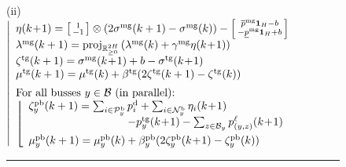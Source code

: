 \documentclass{IEEEtran}  %
\newcommand{\mc}{\mathcal}
\newcommand{\bb}{\mathbb}
\newcommand{\R}{\bb R}
\newcommand{\proj}{\mathrm{proj}}
\newcommand{\0}{\mathbf{0}}
\newcommand{\1}{\mathbf{1}}
\begin{document}
\begin{figure}[t]
{\begin{minipage}{\columnwidth}
\medskip
\noindent
\noindent 
(ii) \\[.2em]
\hspace*{.15em}
$
\left| 
\begin{array}{l}
%
\eta(k\!+\!1) = 
	\left[
	\begin{smallmatrix}
	1\\
	- 1 
	\end{smallmatrix}
	\right] \otimes (2 \sigma^{\text{mg}}(k+1)- \sigma^{\text{mg}}(k)) 
	-
	\left[
	\begin{smallmatrix}
	\overline{p}^{\mathrm{mg}}\1_{H}-b \\
	-     \underline{p}^{\mathrm{mg}} \1_{H}+b
	\end{smallmatrix} 
	\right]\\
	\lambda^{\text{mg}}(k+1) = \textstyle
	\proj_{\R^{2 H}_{\geq 0}}\left( 
	\lambda^{\text{mg}}(k) + \gamma^{\text{mg}} \eta(k\!+\!1)
	 \right)\\
%
\zeta^{\text{tg}}(k+1) = \sigma^{\text{mg}}
	(k\!+\!1)+b- \sigma^{\text{tg}}(k\!+\!1)\\
	\mu^{\text{tg}}(k+1) = \mu^{\text{tg}}(k) + \beta^{\text{tg}} (2\zeta^{\text{tg}}(k+1)-\zeta^{\text{tg}}(k))\\[.5em]
\text{For all busses } y \in \mc B \text{ (in parallel):}\\
\left\lfloor
\begin{array}{l}
\zeta^{\text{pb}}_y(k+1)   = \sum_{i \in \mc P_y^{\mathrm{b}}} p_i^{\mathrm{d}} + \sum_{i \in \mc N_y^{\mathrm{b}}} \eta_i(k\!+\!1)\\
\hspace*{9em} - p^{\text{tg}}_y(k\!+\!1) - \sum_{z \in \mc B_y} p^\ell_{(y,z)} (k\!+\!1)\\[.5em]
%
\mu_y^{\text{pb}}(k+1) = \mu_y^{\text{pb}}(k) + \beta^{\text{pb}}_y (2 \zeta^{\text{pb}}_y(k\!+\!1)- \zeta^{\text{pb}}_y(k))
\end{array}
\right.
\end{array}
\right.
$

\medskip
\hrule
\end{minipage}
}
\end{figure}
\end{document}
